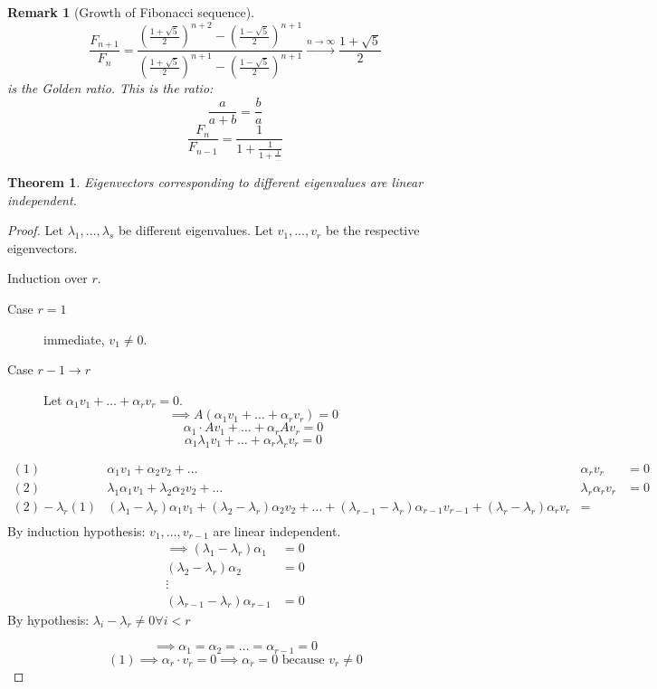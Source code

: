 \documentclass{article}
\newcounter{lecref}[section]
\numberwithin{lecref}{section}
\newtheorem{theorem}[lecref]{Theorem}
\newtheorem{remark}[lecref]{Remark}
\begin{document}
\begin{remark}[Growth of Fibonacci sequence]
  \[ \frac{F_{n+1}}{F_n} = \frac{\left(\frac{1 + \sqrt5}{2}\right)^{n+2} - \left(\frac{1 - \sqrt5}{2}\right)^{n+1}}{\left(\frac{1 + \sqrt5}{2}\right)^{n+1} - \left(\frac{1 - \sqrt5}{2}\right)^{n+1}} \xrightarrow{n\to\infty} \frac{1 + \sqrt5}{2} \]
  is the \emph{Golden ratio}. This is the ratio:
  \[ \frac{a}{a+b} = \frac ba \]
  \[ \frac{F_n}{F_{n-1}} = \frac{1}{1 + \frac{1}{1 + \frac{1}{\dots}}} \]
\end{remark}

\begin{theorem} %
  Eigenvectors corresponding to different eigenvalues are linear independent.
\end{theorem}

\begin{proof}
  Let $\lambda_1, \dots, \lambda_s$ be different eigenvalues. Let $v_1, \dots, v_r$ be the respective eigenvectors.

  Induction over $r$.
  \begin{description}
    \item[Case $r=1$]  immediate, $v_1 \neq 0$.
    \item[Case $r-1 \to r$]
      Let $\alpha_1 v_1 + \dots + \alpha_r v_r = 0$.
      \[ \implies A (\alpha_1 v_1 + \dots + \alpha_r v_r) = 0 \]
      \[ \alpha_1 \cdot A v_1 + \dots + \alpha_r A v_r = 0 \]
      \[ \alpha_1 \lambda_1 v_1 + \dots + \alpha_r \lambda_r v_r = 0 \]
  \end{description}

  \begin{align*}
    (1) & \alpha_1 v_1 + \alpha_2 v_2 + \dots & \alpha_r v_r &= 0 \\
    (2) & \lambda_1 \alpha_1 v_1 + \lambda_2 \alpha_2 v_2 + \dots & \lambda_r \alpha_r v_r &= 0 \\
    \hline
    (2) - \lambda_r (1) & (\lambda_1 - \lambda_r) \alpha_1 v_1 + (\lambda_2 - \lambda_r) \alpha_2 v_2 + \dots + (\lambda_{r-1} - \lambda_r) \alpha_{r-1} v_{r-1} + (\lambda_r - \lambda_r) \alpha_r v_r &= \\
  \end{align*}
  By induction hypothesis: $v_1, \dots, v_{r-1}$ are linear independent.
  \begin{align*}
    \implies (\lambda_1 - \lambda_r) \alpha_1 &= 0 \\
    (\lambda_2 - \lambda_r) \alpha_2 &= 0 \\
    \vdots & \\
    (\lambda_{r-1} - \lambda_r) \alpha_{r-1} &= 0
  \end{align*}
  By hypothesis: $\lambda_i - \lambda_r \neq 0 \forall i < r$

  \[ \implies \alpha_1 = \alpha_2 = \dots = \alpha_{r-1} = 0 \]
  \[ (1) \implies \alpha_r \cdot v_r = 0 \implies \alpha_r = 0 \text{ because } v_r \neq 0 \]
\end{proof}
\end{document}

